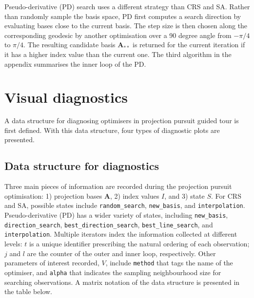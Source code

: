 Pseudo-derivative (PD) search uses a different strategy than CRS and SA.
Rather than randomly sample the basis space, PD first computes a search
direction by evaluating bases close to the current basis. The step size
is then chosen along the corresponding geodesic by another optimisation
over a 90 degree angle from \(-\pi/4\) to \(\pi/4\). The resulting
candidate basis \(\mathbf{A}_{**}\) is returned for the current
iteration if it has a higher index value than the current one. The third
algorithm in the appendix summarises the inner loop of the PD.

\hypertarget{vis-diag}{%
\section{Visual diagnostics}\label{vis-diag}}

A data structure for diagnosing optimisers in projection pursuit guided
tour is first defined. With this data structure, four types of
diagnostic plots are presented.

\hypertarget{data-structure-for-diagnostics}{%
\subsection{Data structure for
diagnostics}\label{data-structure-for-diagnostics}}

Three main pieces of information are recorded during the projection
pursuit optimisation: 1) projection bases \(\mathbf{A}\), 2) index
values \(I\), and 3) state \(S\). For CRS and SA, possible states
include \texttt{random\_search}, \texttt{new\_basis}, and
\texttt{interpolation}. Pseudo-derivative (PD) has a wider variety of
states, including \texttt{new\_basis}, \texttt{direction\_search},
\texttt{best\_direction\_search}, \texttt{best\_line\_search}, and
\texttt{interpolation}. Multiple iterators index the information
collected at different levels: \(t\) is a unique identifier prescribing
the natural ordering of each observation; \(j\) and \(l\) are the
counter of the outer and inner loop, respectively. Other parameters of
interest recorded, \(V\), include \texttt{method} that tags the name of
the optimiser, and \texttt{alpha} that indicates the sampling
neighbourhood size for searching observations. A matrix notation of the
data structure is presented in the table below.

\newpage

